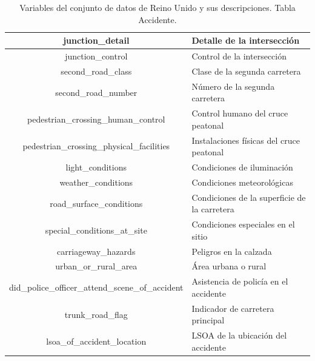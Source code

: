\documentclass{uathesis-es}
\begin{document}
{\begin{table}[H]
\begin{center}
\begin{tabular}{|c|l|}
            junction\_detail & Detalle de la intersección \\ \hline
            junction\_control & Control de la intersección \\ \hline
            second\_road\_class & Clase de la segunda carretera \\ \hline
            second\_road\_number & Número de la segunda carretera \\ \hline
            pedestrian\_crossing\_human\_control & Control humano del cruce peatonal \\ \hline
            pedestrian\_crossing\_physical\_facilities & Instalaciones físicas del cruce peatonal \\ \hline
            light\_conditions & Condiciones de iluminación \\ \hline
            weather\_conditions & Condiciones meteorológicas \\ \hline
            road\_surface\_conditions & Condiciones de la superficie de la carretera \\ \hline
            special\_conditions\_at\_site & Condiciones especiales en el sitio \\ \hline
            carriageway\_hazards & Peligros en la calzada \\ \hline
            urban\_or\_rural\_area & Área urbana o rural \\ \hline
            did\_police\_officer\_attend\_scene\_of\_accident & Asistencia de policía en el accidente \\ \hline
            trunk\_road\_flag & Indicador de carretera principal \\ \hline
            lsoa\_of\_accident\_location & LSOA de la ubicación del accidente \\ \hline
        \end{tabular}
    \end{center}
    \caption{Variables del conjunto de datos de Reino Unido y sus descripciones. Tabla Accidente.}
    \label{UK_ACCIDENT_TABLE}
\end{table} 

}
\end{document}
